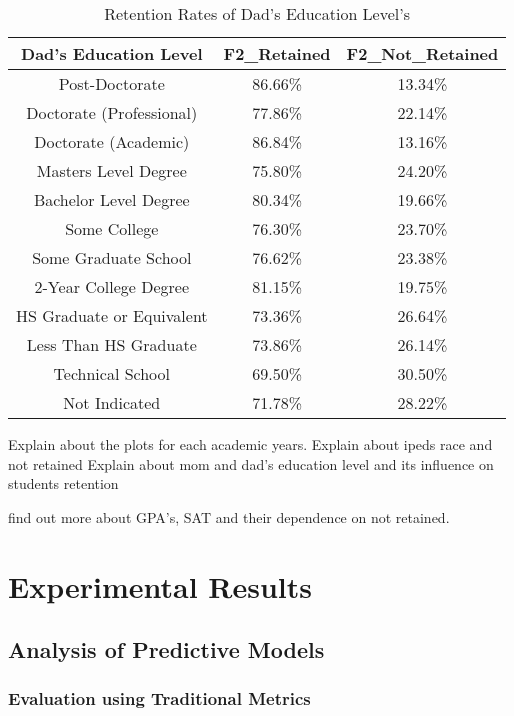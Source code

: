 \documentclass[11pt,openright]{report}
\begin{document}
\begin{table}[!t]
	\renewcommand{\arraystretch}{1.3}
	\caption{Retention Rates of Dad's Education Level's}
	\label{table:dad_edu_retentions}
	\centering
	\begin{tabular}{|c|c|c|}
		\hline
		\bfseries Dad's Education Level & \bfseries F2\_Retained & \bfseries F2\_Not\_Retained\\
		\hline
		Post-Doctorate  & 86.66\%  & 13.34\% \\ \hline
		Doctorate (Professional) & 77.86\% &  22.14\% \\ \hline
		Doctorate (Academic) & 86.84\% & 13.16\% \\ \hline
		Masters Level Degree    &   75.80\% &  24.20\% \\ \hline
		Bachelor Level Degree &  80.34\%  & 19.66\% \\ \hline
		Some College & 76.30\% & 23.70\% \\ \hline
		Some Graduate School  & 76.62\% &  23.38\% \\ \hline
		2-Year College Degree    &  81.15\%  & 19.75\% \\ \hline
		HS Graduate or Equivalent  & 73.36\% &  26.64\% \\ \hline
		Less Than HS Graduate     & 73.86\% &  26.14\% \\ \hline
		Technical School  &         69.50\% &  30.50\% \\ \hline
		Not Indicated         &    71.78\% & 28.22\% \\ \hline
	\end{tabular}
\end{table}


Explain about the plots for each academic years.
Explain about ipeds race and not retained
Explain about mom and dad's education level and its influence on students retention

find out more about GPA's, SAT and their dependence on not retained.

\chapter{Experimental Results} \label{chapter:experiment_results}
\section {Analysis of Predictive Models}
\subsection {Evaluation using Traditional Metrics}
\end{document}

